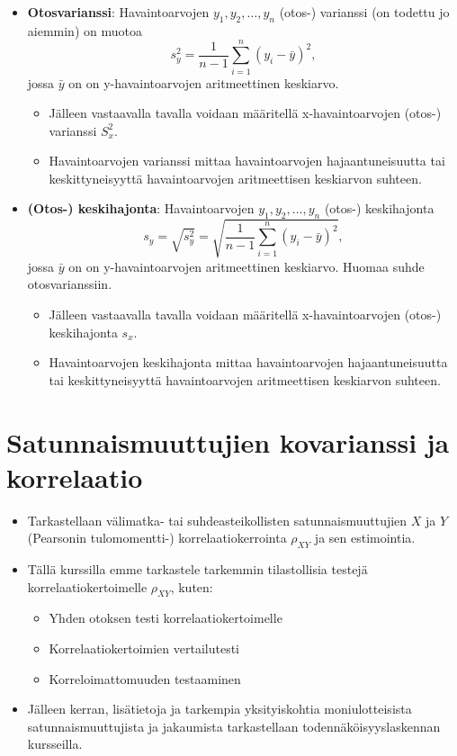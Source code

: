 \documentclass[
]{book}
\providecommand{\tightlist}{%
  \setlength{\itemsep}{0pt}\setlength{\parskip}{0pt}}
\begin{document}
\hfill\break

\begin{itemize}
\tightlist
\item
  \textbf{Otosvarianssi}: Havaintoarvojen \(y_1, y_2,\ldots, y_n\) (otos-) varianssi (on todettu jo aiemmin) on muotoa
  \[
    s^2_y = \frac{1}{n-1} \sum_{i=1}^{n} (y_i - \bar{y})^2,
  \]
  jossa \(\bar{y}\) on on y-havaintoarvojen aritmeettinen keskiarvo.

  \begin{itemize}
  \tightlist
  \item
    Jälleen vastaavalla tavalla voidaan määritellä x-havaintoarvojen (otos-) varianssi \(S^2_x\).
  \item
    Havaintoarvojen varianssi mittaa havaintoarvojen hajaantuneisuutta tai keskittyneisyyttä havaintoarvojen aritmeettisen keskiarvon suhteen.
  \end{itemize}
\item
  \textbf{(Otos-) keskihajonta}: Havaintoarvojen \(y_1, y_2,\ldots, y_n\) (otos-) keskihajonta
  \[
    s_y = \sqrt{s^2_y} = \sqrt{\frac{1}{n-1} \sum_{i=1}^{n} (y_i - \bar{y})^2},
  \]
  jossa \(\bar{y}\) on on y-havaintoarvojen aritmeettinen keskiarvo. Huomaa suhde otosvarianssiin.

  \begin{itemize}
  \tightlist
  \item
    Jälleen vastaavalla tavalla voidaan määritellä x-havaintoarvojen (otos-) keskihajonta \(s_x\).
  \item
    Havaintoarvojen keskihajonta mittaa havaintoarvojen hajaantuneisuutta tai keskittyneisyyttä havaintoarvojen aritmeettisen keskiarvon suhteen.
  \end{itemize}
\end{itemize}

\hfill\break

\hypertarget{alaluku64}{%
\section{Satunnaismuuttujien kovarianssi ja korrelaatio}\label{alaluku64}}

\begin{itemize}
\item
  Tarkastellaan välimatka- tai suhdeasteikollisten satunnaismuuttujien \(X\) ja \(Y\) (Pearsonin tulomomentti-) korrelaatiokerrointa \(\rho_{XY}\) ja sen estimointia.
\item
  Tällä kurssilla emme tarkastele tarkemmin tilastollisia testejä korrelaatiokertoimelle \(\rho_{XY}\), kuten:

  \begin{itemize}
  \tightlist
  \item
    Yhden otoksen testi korrelaatiokertoimelle
  \item
    Korrelaatiokertoimien vertailutesti
  \item
    Korreloimattomuuden testaaminen
  \end{itemize}
\item
  Jälleen kerran, lisätietoja ja tarkempia yksityiskohtia moniulotteisista satunnaismuuttujista ja jakaumista tarkastellaan todennäköisyyslaskennan kursseilla.
\end{itemize}
\end{document}
